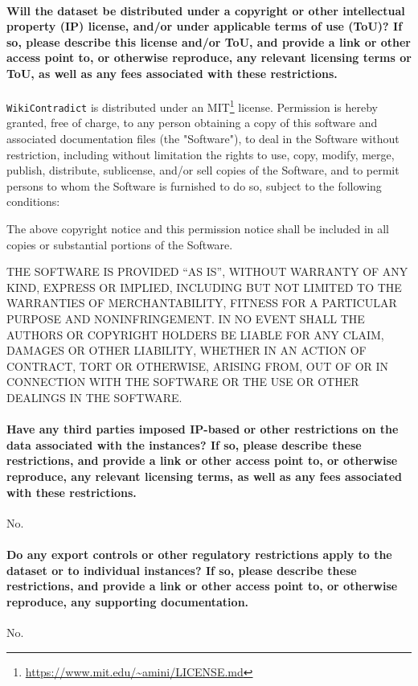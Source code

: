 \documentclass{article}
\begin{document}
\paragraph{Will the dataset be distributed under a copyright or other intellectual property (IP) license,
and/or under applicable terms of use (ToU)? If so, please describe this license and/or ToU, and
provide a link or other access point to, or otherwise reproduce, any relevant licensing terms or
ToU, as well as any fees associated with these restrictions.}
\texttt{WikiContradict} is distributed under an MIT\footnote{\url{https://www.mit.edu/~amini/LICENSE.md}} license.
Permission is hereby granted, free of charge, to any person obtaining a copy of this software and associated documentation files (the "Software"), to deal in the Software without restriction, including without limitation the rights to use, copy, modify, merge, publish, distribute, sublicense, and/or sell copies of the Software, and to permit persons to whom the Software is furnished to do so, subject to the following conditions:

The above copyright notice and this permission notice shall be included in all copies or substantial portions of the Software.

THE SOFTWARE IS PROVIDED ``AS IS'', WITHOUT WARRANTY OF ANY KIND, EXPRESS OR IMPLIED, INCLUDING BUT NOT LIMITED TO THE WARRANTIES OF MERCHANTABILITY, FITNESS FOR A PARTICULAR PURPOSE AND NONINFRINGEMENT. IN NO EVENT SHALL THE AUTHORS OR COPYRIGHT HOLDERS BE LIABLE FOR ANY CLAIM, DAMAGES OR OTHER LIABILITY, WHETHER IN AN ACTION OF CONTRACT, TORT OR OTHERWISE, ARISING FROM, OUT OF OR IN CONNECTION WITH THE SOFTWARE OR THE USE OR OTHER DEALINGS IN THE SOFTWARE.

\paragraph{Have any third parties imposed IP-based or other restrictions on the data associated with the
instances? If so, please describe these restrictions, and provide a link or other access point to,
or otherwise reproduce, any relevant licensing terms, as well as any fees associated with these
restrictions.}
No.

\paragraph{Do any export controls or other regulatory restrictions apply to the dataset or to individual
instances? If so, please describe these restrictions, and provide a link or other access point to,
or otherwise reproduce, any supporting documentation.}
No.
\end{document}
